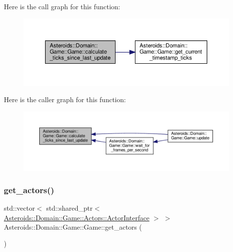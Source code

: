 Here is the call graph for this function\+:\nopagebreak
\begin{figure}[H]
\begin{center}
\leavevmode
\includegraphics[width=350pt]{classAsteroids_1_1Domain_1_1Game_1_1Game_af8a67c4af1521c3184e873f79aad17f3_cgraph}
\end{center}
\end{figure}
Here is the caller graph for this function\+:\nopagebreak
\begin{figure}[H]
\begin{center}
\leavevmode
\includegraphics[width=350pt]{classAsteroids_1_1Domain_1_1Game_1_1Game_af8a67c4af1521c3184e873f79aad17f3_icgraph}
\end{center}
\end{figure}
\mbox{\label{classAsteroids_1_1Domain_1_1Game_1_1Game_af6a7d82ef71615d83aba515a07487641}} 
\subsubsection{\texorpdfstring{get\+\_\+actors()}{get\_actors()}}
{\footnotesize\ttfamily std\+::vector$<$ std\+::shared\+\_\+ptr$<$ \hyperlink{classAsteroids_1_1Domain_1_1Game_1_1Actors_1_1ActorInterface}{Asteroids\+::\+Domain\+::\+Game\+::\+Actors\+::\+Actor\+Interface} $>$ $>$ Asteroids\+::\+Domain\+::\+Game\+::\+Game\+::get\+\_\+actors (\begin{DoxyParamCaption}{ }\end{DoxyParamCaption})\hspace{0.3cm}{\ttfamily [virtual]}}



